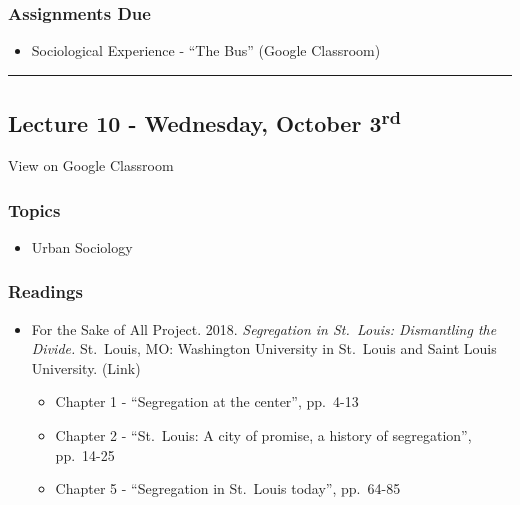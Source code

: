 \documentclass[]{book}
\providecommand{\tightlist}{%
  \setlength{\itemsep}{0pt}\setlength{\parskip}{0pt}}
\theoremstyle{definition}
\theoremstyle{definition}
\theoremstyle{definition}
\theoremstyle{remark}
\begin{document}
\hypertarget{assignments-due-2}{%
\subsubsection*{Assignments Due}\label{assignments-due-2}}

\begin{itemize}
\tightlist
\item
  Sociological Experience - ``The Bus'' (Google Classroom)
\end{itemize}

\begin{center}\rule{0.5\linewidth}{\linethickness}\end{center}

\hypertarget{lecture-10---wednesday-october-3rd}{%
\subsection*{\texorpdfstring{Lecture 10 - Wednesday, October
3\textsuperscript{rd}}{Lecture 10 - Wednesday, October 3rd}}\label{lecture-10---wednesday-october-3rd}}

View on Google Classroom

\hypertarget{topics-11}{%
\subsubsection*{Topics}\label{topics-11}}

\begin{itemize}
\tightlist
\item
  Urban Sociology
\end{itemize}

\hypertarget{readings-10}{%
\subsubsection*{Readings}\label{readings-10}}

\begin{itemize}
\tightlist
\item
  For the Sake of All Project. 2018. \emph{Segregation in St.~Louis:
  Dismantling the Divide.} St.~Louis, MO: Washington University in
  St.~Louis and Saint Louis University. (Link)

  \begin{itemize}
  \tightlist
  \item
    Chapter 1 - ``Segregation at the center'', pp.~4-13
  \item
    Chapter 2 - ``St.~Louis: A city of promise, a history of
    segregation'', pp.~14-25
  \item
    Chapter 5 - ``Segregation in St.~Louis today'', pp.~64-85
  \end{itemize}
\end{itemize}
\end{document}
